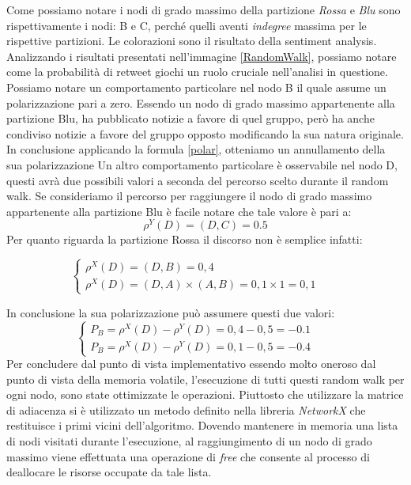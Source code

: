 Come possiamo notare i nodi di grado massimo della partizione \textit{Rossa} e \textit{Blu} sono rispettivamente i nodi: B e C, perché quelli aventi \textit{indegree} massima per le rispettive partizioni. Le colorazioni sono il risultato della sentiment analysis.
Analizzando i risultati presentati nell'immagine \ref{RandomWalk}, possiamo notare come la probabilità di retweet giochi un ruolo cruciale nell'analisi in questione. 
Possiamo notare un comportamento particolare nel nodo B il quale assume un polarizzazione pari a zero. Essendo un nodo di grado massimo appartenente alla partizione Blu, ha pubblicato notizie a favore di quel gruppo, però ha anche condiviso notizie a favore del gruppo opposto modificando la sua natura originale. In conclusione applicando la formula \ref{polar}, otteniamo un annullamento della sua polarizzazione
Un altro comportamento particolare è osservabile nel nodo D, questi avrà due possibili valori a seconda del percorso scelto durante il random walk. Se consideriamo il percorso per raggiungere il nodo di grado massimo appartenente alla partizione Blu è facile notare che tale valore è pari a:
\[\rho^{Y}(D)= (D,C) = 0.5
\]
Per quanto riguarda la partizione Rossa il discorso non è semplice infatti:

\[
\begin{cases}
    \rho^{X}(D)= (D,B)= 0,4        & \quad \\
     \rho^{X}(D)= (D,A)\times(A,B) = 0,1 \times1 = 0,1     & \quad 
  \end{cases}
\]

In conclusione la sua polarizzazione può assumere questi due valori:
\[
\begin{cases}
    P_{B}= \rho^{X}(D)-\rho^{Y}(D) = 0,4 - 0,5 = -0.1   & \quad \\
     P_{B}= \rho^{X}(D)-\rho^{Y}(D) = 0,1 - 0,5 = -0.4    & \quad 
  \end{cases}
\]
Per concludere dal punto di vista implementativo essendo molto oneroso dal punto di vista della memoria volatile, l'esecuzione di tutti questi random walk per ogni nodo, sono state ottimizzate le operazioni. Piuttosto che utilizzare la matrice di adiacenza si è utilizzato un metodo definito nella libreria \textit{NetworkX} che restituisce i primi vicini dell'algoritmo. Dovendo mantenere in memoria una lista di nodi visitati durante l'esecuzione, al raggiungimento di un nodo di grado massimo viene effettuata una operazione di \textit{free} che consente al processo di deallocare le risorse occupate da tale lista.

